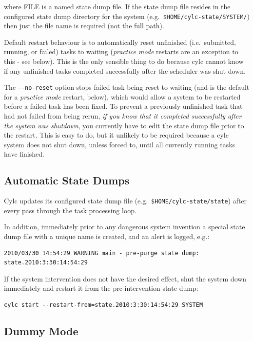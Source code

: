 \documentclass[11pt,a4paper]{article}
\begin{document}
where FILE is a named state dump file. If the state dump file resides in the
configured state dump directory for the system (e.g.\  
\lstinline=$HOME/cylc-state/SYSTEM/=) then just the file name is required 
(not the full path).

Default restart behaviour is to automatically reset unfinished (i.e.\
submitted, running, or failed) tasks to waiting ({\em practice mode}
restarts are an exception to this - see below).  This is the only
sensible thing to do because cylc cannot know if any unfinished tasks
completed successfully after the scheduler was shut down.  

The \lstinline=--no-reset= option stops failed task being reset to 
waiting (and is the default for a {\em practice mode} restart, below), 
which would allow a system to be restarted before a failed task has been
fixed. To prevent a previously unfinished task that had not failed from
being rerun, {\em if you know that it completed successfully after the
system was shutdown}, you currently have to edit the state dump file
prior to the restart.  This is easy to do, but it unlikely to be
required because a cylc system does not shut down, unless forced to, until
all currently running tasks have finished.

\subsection{Automatic State Dumps}

Cylc updates its configured state dump file (e.g.\
\lstinline=$HOME/cylc-state/state=) after every pass through the task 
processing loop.

In addition, immediately prior to any dangerous system invention a 
special state dump file with a unique name is created, and an alert is
logged, e.g.:

\begin{lstlisting}
2010/03/30 14:54:29 WARNING main - pre-purge state dump: state.2010:3:30:14:54:29
\end{lstlisting}

If the system intervention does not have the desired effect, shut the system 
down immediately and restart it from the pre-intervention state dump:

\begin{lstlisting}
cylc start --restart-from=state.2010:3:30:14:54:29 SYSTEM
\end{lstlisting}


\subsection{Dummy Mode} 
\label{DummyMode}
\end{document}
